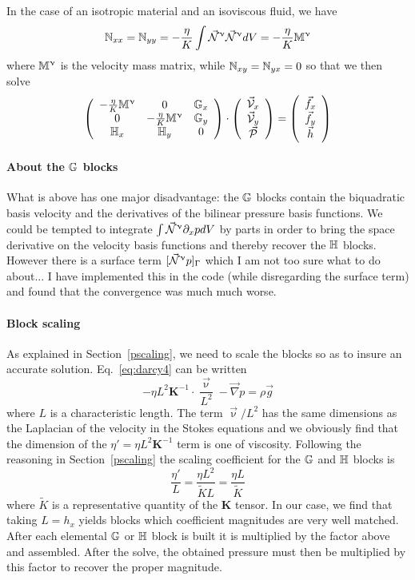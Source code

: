 In the case of an isotropic material and an isoviscous fluid, 
we have 
\[
{\mathbb{N}}_{xx} = {\mathbb{N}}_{yy} 
= - \frac{\eta}{K}  \int \vec{{\mathcal{N}}}^\upnu \vec{{\mathcal{N}}}^\upnu dV
= - \frac{\eta}{K}  {\mathbb{M}}^\upnu 
\]
where ${\mathbb{M}}^\upnu$ is the velocity mass matrix, while ${\mathbb{N}}_{xy} = {\mathbb{N}}_{yx} = 0$ so that we then solve
\[
\left(
\begin{array}{ccc}
-\frac{\eta}{K} {\mathbb{M}}^\upnu & 0 & {\mathbb{G}}_x \\
0 & -\frac{\eta}{K} {\mathbb{M}}^\upnu & {\mathbb{G}}_y \\
{\mathbb{H}}_{x} & {\mathbb{H}}_y & 0 
\end{array}
\right)
\cdot
\left(
\begin{array}{c}
\vec{\cal V}_x \\
\vec{\cal V}_y \\ 
\vec{\cal P}
\end{array}
\right)
=
\left(
\begin{array}{c}
\vec{f}_x \\ 
\vec{f}_y \\ 
\vec{h}
\end{array}
\right)
\]





\paragraph{About the ${\mathbb{G}}$ blocks} What is above has one major disadvantage: the 
${\mathbb{G}}$ blocks contain the biquadratic basis velocity  and the derivatives of the bilinear pressure basis functions. 
We could be tempted to integrate $\int \vec{{\mathcal{N}}}^\upnu \partial_xp dV$ by parts in order to bring the space derivative on the velocity basis functions and thereby recover the ${\mathbb{H}}$ blocks. However there is a surface term $[ \vec{{\mathcal{N}}}^\upnu p]_\Gamma$ which I am not too sure what to do about... I have implemented this in the code (while disregarding the surface term) and found that the convergence was much much worse.


\paragraph{Block scaling} As explained in Section~\ref{pscaling}, we need to scale the blocks so as to insure 
an accurate solution. Eq.~\eqref{eq:darcy4} can be written 
\[
-\eta L^2 {\bm K}^{-1} \cdot \frac{\vec\upnu}{L^2} - \vec\nabla p = \rho \vec{g}
\]
where $L$ is a characteristic length. The term $\vec{\upnu}/L^2$ has the same dimensions as the Laplacian of 
the velocity in the Stokes equations and we obviously find that the dimension of 
the $\eta'=\eta L^2 {\bm K}^{-1}$ term is one of viscosity. 
Following the reasoning in Section~\ref{pscaling} the scaling coefficient for the ${\mathbb{G}}$ and ${\mathbb{H}}$ blocks is 
\[
\frac{\eta'}{L} = \frac{\eta L^2 }{\tilde{K} L} 
= \frac{\eta L}{\tilde{K}}
\]
where $\tilde{K}$ is a representative quantity of the ${\bm K}$ tensor. In our case, we find that taking $L=h_x$ yields blocks 
which coefficient magnitudes are very well matched.
After each elemental ${\mathbb{G}}$ or ${\mathbb{H}}$ block is built it is 
multiplied by the factor above and assembled. 
After the solve, the obtained pressure must then be multiplied by this factor to recover the proper magnitude.


